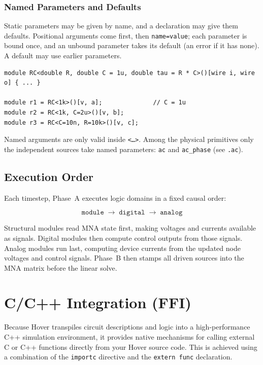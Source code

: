 \documentclass[11pt, a4paper]{article}
\newcommand{\code}[1]{\texttt{\small #1}}
\begin{document}
\subsubsection{Named Parameters and Defaults}
\label{sec:namedargs}

Static parameters may be given by name, and a declaration may give them
defaults. Positional arguments come first, then \code{name=value}; each
parameter is bound once, and an unbound parameter takes its default (an
error if it has none). A default may use earlier parameters.

\begin{lstlisting}
module RC<double R, double C = 1u, double tau = R * C>()[wire i, wire o] { ... }

module r1 = RC<1k>()[v, a];              // C = 1u
module r2 = RC<1k, C=2u>()[v, b];
module r3 = RC<C=10n, R=10k>()[v, c];
\end{lstlisting}

Named arguments are only valid inside \code{<\dots>}. Among the physical
primitives only the independent sources take named parameters:
\code{ac} and \code{ac\_phase} (see \code{.ac}).

\subsection{Execution Order}

Each timestep, Phase~A executes logic domains in a fixed causal order:

\[
\texttt{module} \;\longrightarrow\; \texttt{digital} \;\longrightarrow\; \texttt{analog}
\]

Structural modules read MNA state first, making voltages and currents
available as signals. Digital modules then compute control outputs from those
signals. Analog modules run last, computing device currents from the updated
node voltages and control signals. Phase~B then stamps all driven sources into
the MNA matrix before the linear solve.
\newpage
\section{C/C++ Integration (FFI)}

Because Hover transpiles circuit descriptions and logic into a high-performance C++ simulation environment, it provides native mechanisms for calling external C or C++ functions directly from your Hover source code. This is achieved using a combination of the \code{importc} directive and the \code{extern func} declaration.
\end{document}
